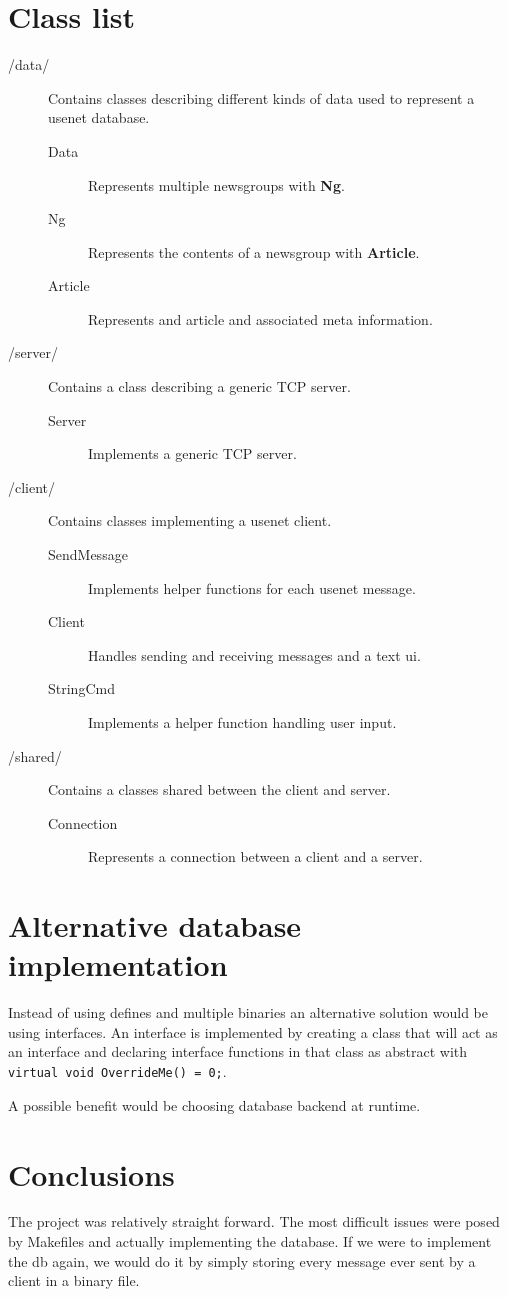 \documentclass[12pt]{article}
\begin{document}
\section*{Class list}

\begin{description}
  \item[/data/] Contains classes describing different kinds of data used to represent a usenet database.
  \begin{description}
    \item[Data] Represents multiple newsgroups with {\bf Ng}.
    \item[Ng] Represents the contents of a newsgroup with {\bf Article}.
    \item[Article] Represents and article and associated meta information.
  \end{description}
  \item[/server/] Contains a class describing a generic TCP server.
  \begin{description}
    \item[Server] Implements a generic TCP server.
  \end{description}
  \item[/client/] Contains classes implementing a usenet client.
  \begin{description}
    \item[SendMessage] Implements helper functions for each usenet message.
    \item[Client] Handles sending and receiving messages and a text ui.
    \item[StringCmd] Implements a helper function handling user input.
  \end{description}
  \item[/shared/] Contains a classes shared between the client and server.
  \begin{description}
    \item[Connection] Represents a connection between a client and a server.
  \end{description}
\end{description}

\section*{Alternative database implementation}
Instead of using defines and multiple binaries an alternative solution would be using interfaces.
An interface is implemented by creating a class that will act as an interface and declaring interface functions in that class as abstract with \verb'virtual void OverrideMe() = 0;'.

A possible benefit would be choosing database backend at runtime.

\section{Conclusions}
The project was relatively straight forward. The most difficult issues were posed by Makefiles and actually implementing the database. If we were to implement the db again, we would do it by simply storing every message ever sent by a client in a binary file.
\end{document}
